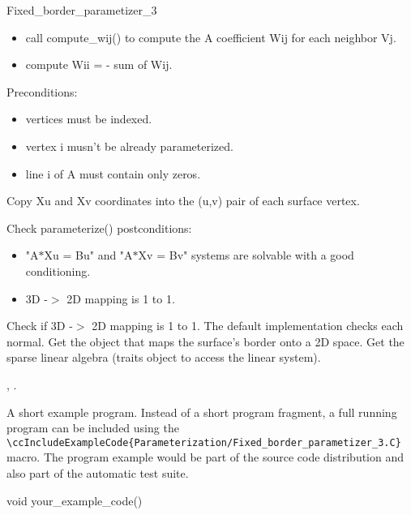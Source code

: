 \begin{ccRefClass}{Fixed_border_parametizer_3}
{\begin{itemize}
\item call compute\_wij() to compute the A coefficient Wij for each neighbor Vj.\item compute Wii = - sum of Wij.\end{itemize}
Preconditions:\begin{itemize}
\item vertices must be indexed.\item vertex i musn't be already parameterized.\item line i of A must contain only zeros. \end{itemize}
}
{
Copy Xu and Xv coordinates into the (u,v) pair of each surface vertex.
}
{
Check parameterize() postconditions:\begin{itemize}
\item "A$\ast$Xu = Bu" and "A$\ast$Xv = Bv" systems are solvable with a good conditioning.\item 3D -$>$ 2D mapping is 1 to 1. \end{itemize}
}
{
Check if 3D -$>$ 2D mapping is 1 to 1. The default implementation checks each normal.
}
{
Get the object that maps the surface's border onto a 2D space.
}
{
Get the sparse linear algebra (traits object to access the linear system).
}


\ccSeeAlso

,
.

\ccExample

A short example program.
Instead of a short program fragment, a full running program can be
included using the
\verb|\ccIncludeExampleCode{Parameterization/Fixed_border_parametizer_3.C}|
macro. The program example would be part of the source code distribution and
also part of the automatic test suite.

\begin{ccExampleCode}
void your_example_code() {
}
\end{ccExampleCode}


\end{ccRefClass}


